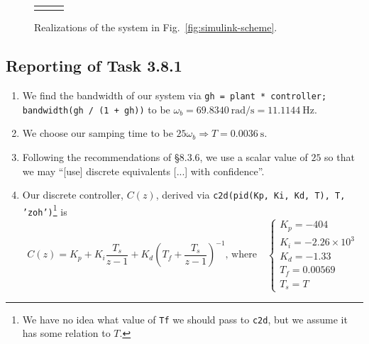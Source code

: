 \documentclass[11pt]{article} %
\begin{document}
\begin{enumerate}
\begin{figure}
\begin{tabular}{cc}
      &
      &
      \\
    \end{tabular}
    \caption{Realizations of the system in Fig.~\ref{fig:simulink-scheme}.}
  \end{figure}
\end{enumerate}

\subsection*{Reporting of Task 3.8.1}
\begin{enumerate}
\item We find the bandwidth of our system via \texttt{gh = plant *
    controller; bandwidth(gh / (1 + gh))} to be
  $\omega_b = 69.8340~\text{rad/s} = 11.1144~\text{Hz}$.
\item We choose our samping time to be
  $25\omega_b \Rightarrow T = 0.0036~\text{s}$.
\item Following the recommendations of §8.3.6, we use a scalar value
  of $25$ so that we may ``[use] discrete equivalents [...] with
  confidence''.
\item
  Our discrete controller, $C(z)$, derived via \texttt{c2d(pid(Kp, Ki,
    Kd, T), T, ’zoh’)}\footnote{We have no idea what value of
    \texttt{Tf} we should pass to \texttt{c2d}, but we assume it has
    some relation to $T$.} is
  \begin{equation}
    C(z) =
    K_p
    + K_i\frac{T_s}{z - 1}
    + K_d\left(
      T_f + \frac{T_s}{z - 1}
    \right)^{-1}
    \text{, where}
    \quad
    \begin{cases}
      K_p = -404 \\
      K_i = -2.26 \times 10^{3} \\
      K_d = -1.33 \\
      T_f = 0.00569 \\
      T_s = T
    \end{cases}
  \end{equation}
\end{enumerate}
\end{document}
